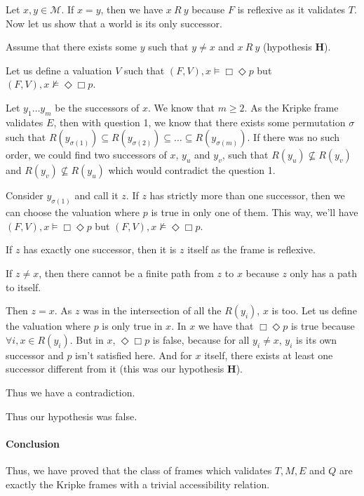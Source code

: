 \documentclass[10pt]{article}
\def\M{\mathcal{M}}
\begin{document}
Let $x,y\in\M$. If $x=y$, then we have $x\ R\ y$ because $F$ is reflexive as it validates $T$.
Now let us show that a world is its only successor.

Assume that there exists some $y$ such that $y\neq x$ and $x\ R\ y$ (hypothesis \textbf{H}).

Let us define a valuation $V$ such that $(F,V),x\models\Box\Diamond p$ but $(F,V),x\not\models\Diamond\Box p$.

Let $y_1\dots y_m$ be the successors of $x$. We know that $m\geq 2$.
As the Kripke frame validates $E$, then with question 1, we know that there exists some permutation $\sigma$ such that $R(y_{\sigma(1)})\subseteq R(y_{\sigma(2)}) \subseteq\dots\subseteq R(y_{\sigma(m)})$. If there was no such order, we could find two successors of $x$, $y_u$ and $y_v$, such that $R(y_u)\not\subseteq R(y_v)$ and $R(y_v)\not\subseteq R(y_u)$ which would contradict the question 1. 

Consider $y_{\sigma(1)}$ and call it $z$. If $z$ has strictly more than one successor, then we can choose the valuation where $p$ is true in only one of them. This way, we'll have $(F,V),x\models\Box\Diamond p$ but $(F,V),x\not\models\Diamond\Box p$.

If $z$ has exactly one successor, then it is $z$ itself as the frame is reflexive.

If $z\neq x$, then there cannot be a finite path from $z$ to $x$ because $z$ only has a path to itself.

Then $z=x$. As $z$ was in the intersection of all the $R(y_i)$, $x$ is too. Let us define the valuation where $p$ is only true in $x$. In $x$ we have that $\Box\Diamond p$ is true because  $\forall i,x\in R(y_i)$.
But in $x$, $\Diamond\Box p$ is false, because for all $y_i\neq x$, $y_i$ is its own successor and $p$ isn't satisfied here. And for $x$ itself, there exists at least one successor different from it (this was our hypothesis \textbf{H}).

Thus we have a contradiction.

Thus our hypothesis was false.



\paragraph{Conclusion}
Thus, we have proved that the class of frames which validates $T,M,E$ and $Q$ are exactly the Kripke frames with a trivial accessibility relation.
\end{document}

